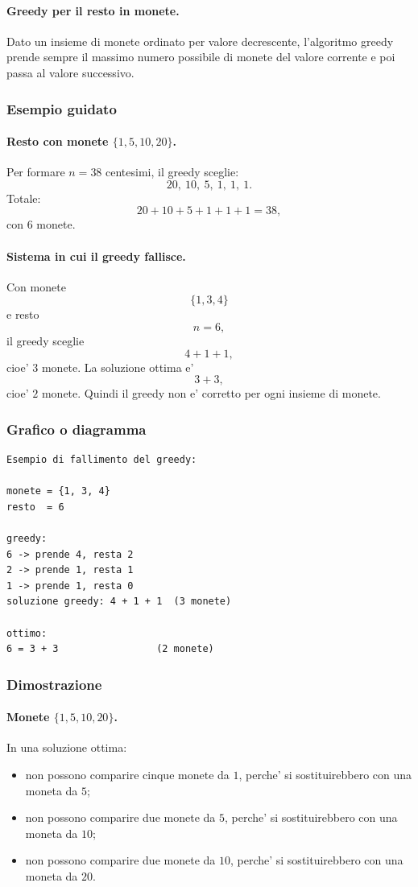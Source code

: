 \paragraph{Greedy per il resto in monete.}
Dato un insieme di monete ordinato per valore decrescente, l'algoritmo greedy prende sempre il massimo numero possibile di monete del valore corrente e poi passa al valore successivo.

\subsubsection{Esempio guidato}
\paragraph{Resto con monete $\{1,5,10,20\}$.}
Per formare $n=38$ centesimi, il greedy sceglie:
\[
20,\ 10,\ 5,\ 1,\ 1,\ 1.
\]
Totale:
\[
20+10+5+1+1+1=38,
\]
con $6$ monete.

\paragraph{Sistema in cui il greedy fallisce.}
Con monete
\[
\{1,3,4\}
\]
e resto
\[
n=6,
\]
il greedy sceglie
\[
4+1+1,
\]
cioe' $3$ monete. La soluzione ottima e'
\[
3+3,
\]
cioe' $2$ monete. Quindi il greedy non e' corretto per ogni insieme di monete.

\subsubsection{Grafico o diagramma}
\begin{center}
\begin{verbatim}
Esempio di fallimento del greedy:

monete = {1, 3, 4}
resto  = 6

greedy:
6 -> prende 4, resta 2
2 -> prende 1, resta 1
1 -> prende 1, resta 0
soluzione greedy: 4 + 1 + 1  (3 monete)

ottimo:
6 = 3 + 3                 (2 monete)
\end{verbatim}
\end{center}

\subsubsection{Dimostrazione}
\paragraph{Monete $\{1,5,10,20\}$.}
In una soluzione ottima:
\begin{itemize}
	\item non possono comparire cinque monete da $1$, perche' si sostituirebbero con una moneta da $5$;
	\item non possono comparire due monete da $5$, perche' si sostituirebbero con una moneta da $10$;
	\item non possono comparire due monete da $10$, perche' si sostituirebbero con una moneta da $20$.
\end{itemize}

